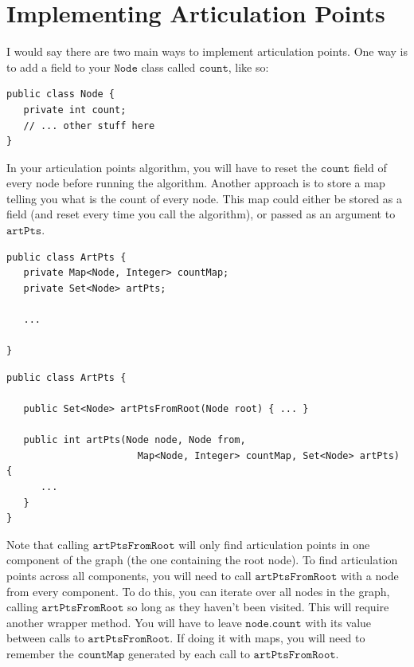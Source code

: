 \documentclass[a4paper,12pt]{article}
\newcommand{\kwa}[1]{\mathtt{#1}}
\begin{document}
\section{Implementing Articulation Points}

I would say there are two main ways to implement articulation points. One way is to add a field to your $\kwa{Node}$ class called $\kwa{count}$, like so:

\begin{lstlisting}
public class Node {
   private int count;
   // ... other stuff here
}
\end{lstlisting}

\noindent
In your articulation points algorithm, you will have to reset the $\kwa{count}$ field of every node before running the algorithm. Another approach is to store a map telling you what is the count of every node. This map could either be stored as a field (and reset every time you call the algorithm), or passed as an argument to $\kwa{artPts}$.

\begin{lstlisting}
public class ArtPts {
   private Map<Node, Integer> countMap;
   private Set<Node> artPts;
   
   ...
   
}
\end{lstlisting}

\begin{lstlisting}
public class ArtPts {

   public Set<Node> artPtsFromRoot(Node root) { ... }

   public int artPts(Node node, Node from,
                       Map<Node, Integer> countMap, Set<Node> artPts) {
      ...
   }
}

\end{lstlisting}

\noindent
Note that calling $\kwa{artPtsFromRoot}$ will only find articulation points in one component of the graph (the one containing the root node). To find articulation points across all components, you will need to call $\kwa{artPtsFromRoot}$ with a node from every component. To do this, you can iterate over all nodes in the graph, calling $\kwa{artPtsFromRoot}$ so long as they haven't been visited. This will require another wrapper method. You will have to leave $\kwa{node.count}$ with its value between calls to $\kwa{artPtsFromRoot}$. If doing it with maps, you will need to remember the $\kwa{countMap}$ generated by each call to $\kwa{artPtsFromRoot}$. 
\end{document}

